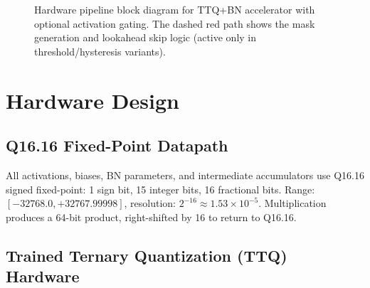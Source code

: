 \documentclass[conference]{IEEEtran}
\begin{document}
\begin{figure}[t]
\caption{Hardware pipeline block diagram for TTQ+BN accelerator with optional activation gating. The dashed red path shows the mask generation and lookahead skip logic (active only in threshold/hysteresis variants).}
\label{fig:hw_pipeline}
\end{figure}


\section{Hardware Design}
\label{sec:hw_design}

\subsection{Q16.16 Fixed-Point Datapath}

All activations, biases, BN parameters, and intermediate accumulators use Q16.16 signed fixed-point: 1 sign bit, 15 integer bits, 16 fractional bits. Range: $[-32768.0, +32767.99998]$, resolution: $2^{-16} \approx 1.53 \times 10^{-5}$. Multiplication produces a 64-bit product, right-shifted by 16 to return to Q16.16.

\subsection{Trained Ternary Quantization (TTQ) Hardware}
\end{document}
